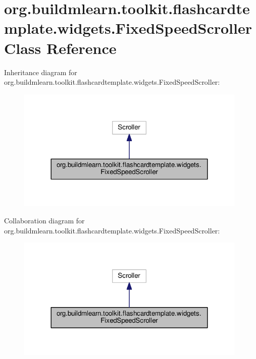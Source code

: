 \hypertarget{classorg_1_1buildmlearn_1_1toolkit_1_1flashcardtemplate_1_1widgets_1_1FixedSpeedScroller}{}\section{org.\+buildmlearn.\+toolkit.\+flashcardtemplate.\+widgets.\+Fixed\+Speed\+Scroller Class Reference}
\label{classorg_1_1buildmlearn_1_1toolkit_1_1flashcardtemplate_1_1widgets_1_1FixedSpeedScroller}


Inheritance diagram for org.\+buildmlearn.\+toolkit.\+flashcardtemplate.\+widgets.\+Fixed\+Speed\+Scroller\+:
\nopagebreak
\begin{figure}[H]
\begin{center}
\leavevmode
\includegraphics[width=312pt]{classorg_1_1buildmlearn_1_1toolkit_1_1flashcardtemplate_1_1widgets_1_1FixedSpeedScroller__inherit__graph}
\end{center}
\end{figure}


Collaboration diagram for org.\+buildmlearn.\+toolkit.\+flashcardtemplate.\+widgets.\+Fixed\+Speed\+Scroller\+:
\nopagebreak
\begin{figure}[H]
\begin{center}
\leavevmode
\includegraphics[width=312pt]{classorg_1_1buildmlearn_1_1toolkit_1_1flashcardtemplate_1_1widgets_1_1FixedSpeedScroller__coll__graph}
\end{center}
\end{figure}
